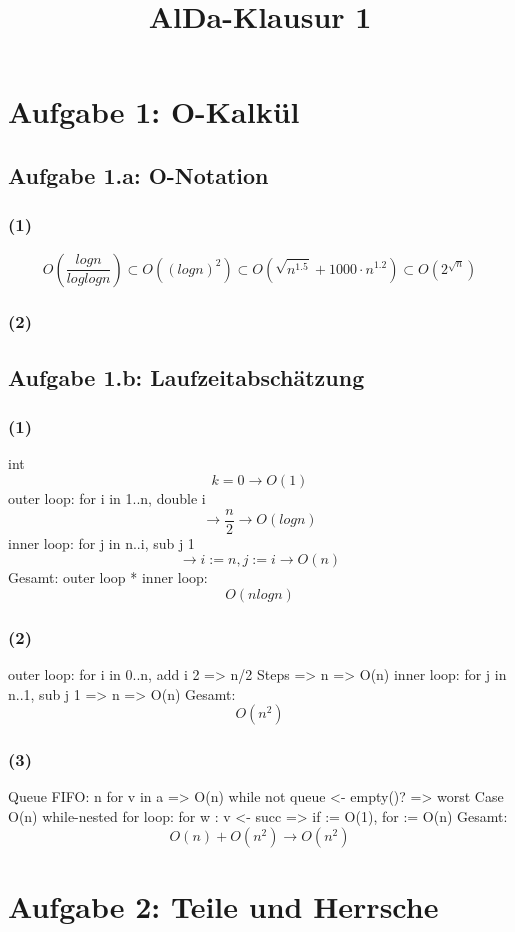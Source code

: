 \documentclass[a4paper,12pt]{article}
\title{AlDa-Klausur 1}
\begin{document}
\maketitle
\section*{Aufgabe 1: O-Kalkül}
\subsection*{Aufgabe 1.a: O-Notation}
\subsubsection*{(1)}
$$O(\frac{log n}{log log n}) \subset O((log n)^2) \subset O(\sqrt{n^{1.5}} + 1000 \cdot n^{1.2}) \subset O(2^{\sqrt{n}})$$
\subsubsection*{(2)}
\subsection*{Aufgabe 1.b: Laufzeitabschätzung}
\subsubsection*{(1)}
int $$k = 0 \rightarrow O(1)$$
outer loop: for i in 1..n, double i $$\rightarrow \frac{n}{2} \rightarrow O(log n)$$
inner loop: for j in n..i, sub j 1 $$\rightarrow i := n, j := i \rightarrow O(n)$$
Gesamt: outer loop * inner loop: $$O(n log n)$$

\subsubsection*{(2)}
outer loop: for i in 0..n, add i 2 => n/2 Steps => n => O(n)
inner loop: for j in n..1, sub j 1 => n => O(n)
Gesamt: $$O(n^2)$$
\subsubsection*{(3)}
Queue FIFO: n
for v in a => O(n)
while not queue <- empty()? => worst Case O(n)
while-nested for loop: for w : v <- succ => if := O(1), for := O(n)
Gesamt: $$O(n) + O(n^2) \rightarrow O(n^2)$$
\section*{Aufgabe 2: Teile und Herrsche}
\end{document}
